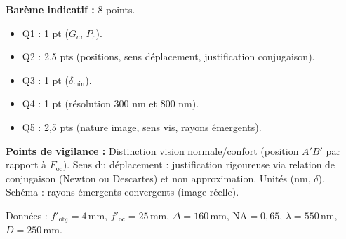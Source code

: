 \documentclass[11pt]{article}
\begin{document}
\begin{corrige}
\textbf{Barème indicatif :} 8 points.
\begin{itemize}
    \item Q1 : 1 pt ($G_c$, $P_c$).
    \item Q2 : 2,5 pts (positions, sens déplacement, justification conjugaison).
    \item Q3 : 1 pt ($\delta_{\text{min}}$).
    \item Q4 : 1 pt (résolution 300 nm et 800 nm).
    \item Q5 : 2,5 pts (nature image, sens vis, rayons émergents).
\end{itemize}
\textbf{Points de vigilance :} Distinction vision normale/confort (position $A'B'$ par rapport à $F_{\text{oc}}$). Sens du déplacement : justification rigoureuse via relation de conjugaison (Newton ou Descartes) et non approximation. Unités (nm, $\delta$). Schéma : rayons émergents convergents (image réelle).

Données : $f'_{\text{obj}} = 4\,\text{mm}$, $f'_{\text{oc}} = 25\,\text{mm}$, $\Delta = 160\,\text{mm}$, $\text{NA}=0,65$, $\lambda=550\,\text{nm}$, $D=250\,\text{mm}$.


\end{corrige}
\end{document}
